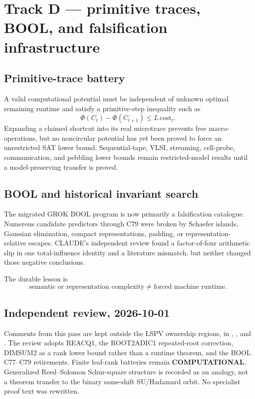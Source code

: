 \documentclass[11pt]{article}
\begin{document}
\section{Track D --- primitive traces, BOOL, and falsification infrastructure}

\subsection{Primitive-trace battery}

A valid computational potential must be independent of unknown optimal remaining runtime and satisfy
a primitive-step inequality such as
\[
\Phi(C_t)-\Phi(C_{t+1})\le L\,\mathrm{cost}_t.
\]
Expanding a claimed shortcut into its real microtrace prevents free macro-operations, but no
noncircular potential has yet been proved to force an unrestricted SAT lower bound. Sequential-tape,
VLSI, streaming, cell-probe, communication, and pebbling lower bounds remain restricted-model
results until a model-preserving transfer is proved.

\subsection{BOOL and historical invariant search}

The migrated GROK BOOL program is now primarily a falsification catalogue. Numerous candidate
predictors through C79 were broken by Schaefer islands, Gaussian elimination, compact
representations, padding, or representation-relative escapes. CLAUDE's independent review found a
factor-of-four arithmetic slip in one total-influence identity and a literature mismatch, but neither
changed those negative conclusions.

The durable lesson is
\[
\boxed{\text{semantic or representation complexity}\ne\text{forced machine runtime}.}
\]

\subsection{Independent review, 2026-10-01}

Comments from this pass are kept outside the LSPV ownership regions, in
, , and .
The review adopts REACQ1, the ROOT2ADIC1 repeated-root correction, DIMSUM2 as a
rank lower bound rather than a runtime theorem, and the BOOL C77--C79 retirements.
Finite leaf-rank batteries remain \textbf{COMPUTATIONAL}. Generalized Reed--Solomon
Schur-square structure is recorded as an analogy, not a theorem transfer to the
binary same-shift SU/Hadamard orbit. No specialist proof text was rewritten.
\end{document}
